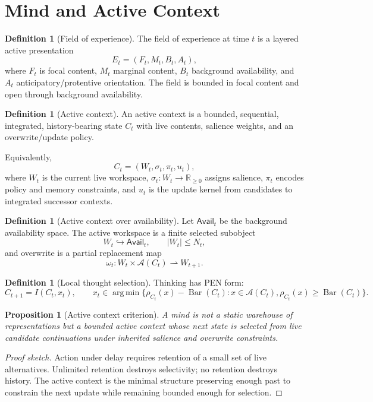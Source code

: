 \documentclass[11pt]{article}
\theoremstyle{plain}
\newtheorem{proposition}[theorem]{Proposition}
\theoremstyle{definition}
\newtheorem{definition}[theorem]{Definition}
\theoremstyle{remark}
\newenvironment{proofsketch}{\begin{proof}[Proof sketch]}{\end{proof}}
\newcommand{\A}{\mathcal{A}}
\newcommand{\SelBar}{\operatorname{Bar}}
\newcommand{\argmin}{\operatorname*{arg\,min}}
\begin{document}
\section{Mind and Active Context}

\begin{definition}[Field of experience]
The field of experience at time \(t\) is a layered active presentation
\[
E_t=(F_t,M_t,B_t,A_t),
\]
where \(F_t\) is focal content, \(M_t\) marginal content, \(B_t\) background availability, and \(A_t\) anticipatory/protentive orientation. The field is bounded in focal content and open through background availability.
\end{definition}

\begin{definition}[Active context]
An active context is a bounded, sequential, integrated, history-bearing state \(C_t\) with live contents, salience weights, and an overwrite/update policy.
\end{definition}

Equivalently,
\[
C_t=(W_t,\sigma_t,\pi_t,u_t),
\]
where \(W_t\) is the current live workspace, \(\sigma_t:W_t\to\mathbb{R}_{\ge0}\) assigns salience, \(\pi_t\) encodes policy and memory constraints, and \(u_t\) is the update kernel from candidates to integrated successor contexts.

\begin{definition}[Active context over availability]
Let \(\mathsf{Avail}_t\) be the background availability space. The active workspace is a finite selected subobject
\[
W_t\hookrightarrow \mathsf{Avail}_t,
\qquad
|W_t|\le N_t,
\]
and overwrite is a partial replacement map
\[
\omega_t:W_t\times\A(C_t)\rightharpoonup W_{t+1}.
\]
\end{definition}

\begin{definition}[Local thought selection]
Thinking has PEN form:
\[
C_{t+1}=I(C_t,x_t),
\qquad
x_t\in
\argmin\{\rho_{C_t}(x)-\SelBar(C_t):x\in\A(C_t),\rho_{C_t}(x)\ge\SelBar(C_t)\}.
\]
\end{definition}

\begin{proposition}[Active context criterion]
A mind is not a static warehouse of representations but a bounded active context whose next state is selected from live candidate continuations under inherited salience and overwrite constraints.
\end{proposition}

\begin{proofsketch}
Action under delay requires retention of a small set of live alternatives. Unlimited retention destroys selectivity; no retention destroys history. The active context is the minimal structure preserving enough past to constrain the next update while remaining bounded enough for selection.
\end{proofsketch}
\end{document}
